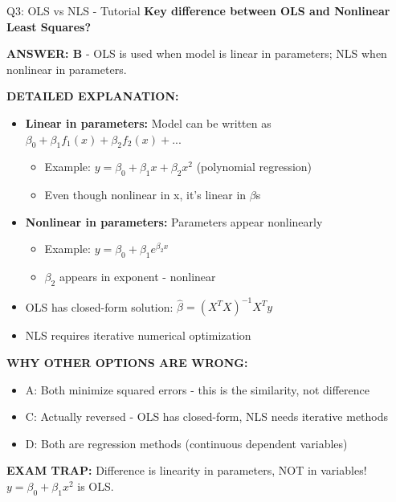 \documentclass[8pt]{beamer}
\begin{document}
	\begin{frame}{Q3: OLS vs NLS - Tutorial}
		\fontsize{6.5}{7.5}\selectfont
		\textbf{Key difference between OLS and Nonlinear Least Squares?}
		
		\vspace{0.05cm}
		\textcolor{myblue}{\textbf{ANSWER: B}} - OLS is used when model is linear in parameters; NLS when nonlinear in parameters.
		
		\vspace{0.05cm}
		\textbf{DETAILED EXPLANATION:}
		\begin{itemize}
			\item \textbf{Linear in parameters:} Model can be written as $\beta_0 + \beta_1 f_1(x) + \beta_2 f_2(x) + ...$
			\begin{itemize}
				\item Example: $y = \beta_0 + \beta_1 x + \beta_2 x^2$ (polynomial regression)
				\item Even though nonlinear in x, it's linear in $\beta$s
			\end{itemize}
			\item \textbf{Nonlinear in parameters:} Parameters appear nonlinearly
			\begin{itemize}
				\item Example: $y = \beta_0 + \beta_1 e^{\beta_2 x}$
				\item $\beta_2$ appears in exponent - nonlinear
			\end{itemize}
			\item OLS has closed-form solution: $\hat{\beta} = (X^TX)^{-1}X^Ty$
			\item NLS requires iterative numerical optimization
		\end{itemize}
		
		\vspace{0.05cm}
		\textcolor{myred}{\textbf{WHY OTHER OPTIONS ARE WRONG:}}
		\begin{itemize}
			\item \textcolor{myred}{A:} Both minimize squared errors - this is the similarity, not difference
			\item \textcolor{myred}{C:} Actually reversed - OLS has closed-form, NLS needs iterative methods
			\item \textcolor{myred}{D:} Both are regression methods (continuous dependent variables)
		\end{itemize}
		
		\textcolor{myred}{\textbf{EXAM TRAP:}} Difference is \textcolor{myblue}{linearity in parameters}, NOT in variables! $y = \beta_0 + \beta_1 x^2$ is OLS.
	\end{frame}
	
\end{document}
